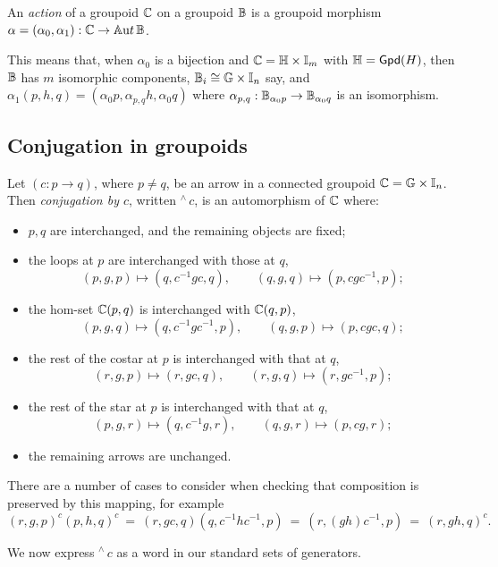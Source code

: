 \begin{defn}
An \emph{action} of a groupoid $\mathbb{C}$ on a groupoid $\mathbb{B}$ 
is a groupoid morphism $\alpha=(\alpha_0,\alpha_1):\mathbb{C}\to\mathbb{A}{\mathrm ut}\,\mathbb{B}$. 
\end{defn}

This means that, when $\alpha_0$ is a bijection and 
$\mathbb{C} = \mathbb{H} \times \mathbb{I}_m$ with $\mathbb{H} = {\sf Gpd}(H)$, 
then $\mathbb{B}$ has $m$ isomorphic components, 
$\mathbb{B}_i \cong \mathbb{G} \times \mathbb{I}_n$ say, 
and $\alpha_1(p,h,q) = (\alpha_0p, \alpha_{p,q}h, \alpha_0q)$ 
where $\alpha_{p,q} : \mathbb{B}_{\alpha_0p} \to \mathbb{B}_{\alpha_0q}$ 
is an isomorphism. 




\subsection{Conjugation in groupoids}


\begin{defn}
Let $(c : p \to q)$, where $p \neq q$, 
be an arrow in a connected groupoid $\mathbb{C} = \mathbb{G} \times \mathbb{I}_n$. 
Then \emph{conjugation by $c$}, written ${}^{\wedge}\,c$, 
is an automorphism of $\mathbb{C}$ where: 
\begin{itemize}
\item
$p,q$ are interchanged, and the remaining objects are fixed; 
\item
the loops at $p$ are interchanged with those at $q$, 
$$
(p,g,p) \mapsto (q,c^{-1}gc,q), \qquad 
(q,g,q) \mapsto (p,cgc^{-1},p); 
$$
\item
the hom-set $\mathbb{C}(p,q)$ is interchanged with $\mathbb{C}(q,p)$, 
$$
(p,g,q) \mapsto (q,c^{-1}gc^{-1},p), \qquad 
(q,g,p) \mapsto (p,cgc,q);
$$
\item
the rest of the costar at $p$ is interchanged with that at $q$, 
$$
(r,g,p) \mapsto (r,gc,q), \qquad 
(r,g,q) \mapsto (r,gc^{-1},p);
$$
\item
the rest of the star at $p$ is interchanged with that at $q$, 
$$
(p,g,r) \mapsto (q,c^{-1}g,r), \qquad 
(q,g,r) \mapsto (p,cg,r);
$$
\item
the remaining arrows are unchanged. 
\end{itemize}
\end{defn}
There are a number of cases to consider when checking that composition 
is preserved by this mapping, for example 
$$
(r,g,p)^c(p,h,q)^c 
~=~ (r,gc,q)(q,c^{-1}hc^{-1},p) 
~=~ (r,(gh)c^{-1},p) 
~=~ (r,gh,q)^c. 
$$

\bigskip 
We now express ${}^{\wedge}\,c$ as a word in our standard sets of generators. 

